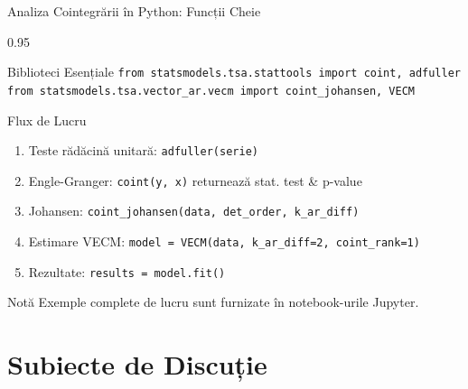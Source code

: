 \documentclass[9pt, aspectratio=169, t]{beamer}
\begin{document}
\begin{frame}{Analiza Cointegrării în Python: Funcții Cheie}
    \begin{cminipage}{0.95\textwidth}
    {\footnotesize
    \begin{block}{Biblioteci Esențiale}
        \texttt{from statsmodels.tsa.stattools import coint, adfuller} \\
        \texttt{from statsmodels.tsa.vector\_ar.vecm import coint\_johansen, VECM}
    \end{block}

    \begin{block}{Flux de Lucru}
        \begin{enumerate}\setlength{\itemsep}{0pt}
            \item Teste rădăcină unitară: \texttt{adfuller(serie)}
            \item Engle-Granger: \texttt{coint(y, x)} returnează stat. test \& p-value
            \item Johansen: \texttt{coint\_johansen(data, det\_order, k\_ar\_diff)}
            \item Estimare VECM: \texttt{model = VECM(data, k\_ar\_diff=2, coint\_rank=1)}
            \item Rezultate: \texttt{results = model.fit()}
        \end{enumerate}
    \end{block}

    \begin{alertblock}{Notă}
        Exemple complete de lucru sunt furnizate în notebook-urile Jupyter.
    \end{alertblock}
    }
    \end{cminipage}
\end{frame}

\section{Subiecte de Discuție}
\end{document}
